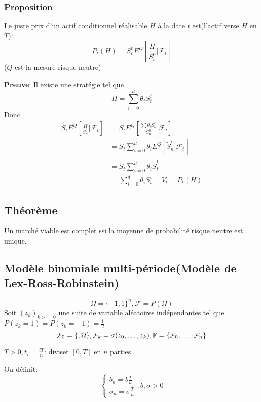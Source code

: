 \documentclass{article}
\begin{document}
\subsubsection{Proposition}
Le juste prix d'un actif conditionnel r\'ealisable $H$ \`a la date $t$ est(l'actif verse $H$ en $T$):
\begin{equation}
P_t(H)=S_t^0 E^Q[\frac{H}{S^0_t}|\mathcal{F}_t]
\end{equation}
($Q$ est la mesure risque neutre)

\textbf{Preuve}:
Il existe une strat\'egie \theta tel que 
\begin{equation}
H=\sum_{i=0}^d \theta_i S_t^i
\end{equation}
Donc
\begin{equation}
\begin{split}
S_tE^Q[\frac{H}{S_n^0}|\mathcal{F}_t]&=S_tE^Q[\frac{\sum\theta_i S_n^i}{S_n^0}|\mathcal{F}_t]\\
&=S_t\sum_{i=0}^d\theta_i E^Q[\tilde{S}_n^i|\mathcal{F}_t]\\
&=S_t\sum_{i=0}^d\theta_i\tilde{S}_t^i\\
&=\sum_{i=0}^d\theta_i S_t^i=V_t=P_t(H)
\end{split}
\end{equation}

\subsection{Th\'eor\`eme}
Un march\'e viable est complet ssi la moyenne de probabilit\'e risque neutre est unique.

\subsection{Mod\`ele binomiale multi-p\'eriode(Mod\`ele de Lex-Ross-Robinstein)}
\begin{equation}
\Omega=\{-1,1\}^n,\mathcal{F}=P(\Omega)
\end{equation}
Soit $(z_k)_{k>=0}$ une suite de variable al\'eatoires ind\'ependantes tel que $P(z_k=1)=P(z_k=-1)=\frac{1}{2}$
\begin{equation}
\mathcal{F}_0=\{\empty,\Omega\},\mathcal{F}_k=\sigma(z_0,\ldots,z_k),\mathbb{F}=\{\mathcal{F}_0,\ldots,\mathcal{F}_n\}
\end{equation}

$T>0, t_i=\frac{iT}{n}$: diviser $[0,T]$ en $n$ parties.

On d\'efinit:
\begin{equation}
\left\{\begin{array}{rcl}
b_n=b\frac{T}{n}\\
\sigma_n=\sigma\frac{T}{n}
\end{array}\right.
,b,\sigma>0
\end{equation}
\end{document}
